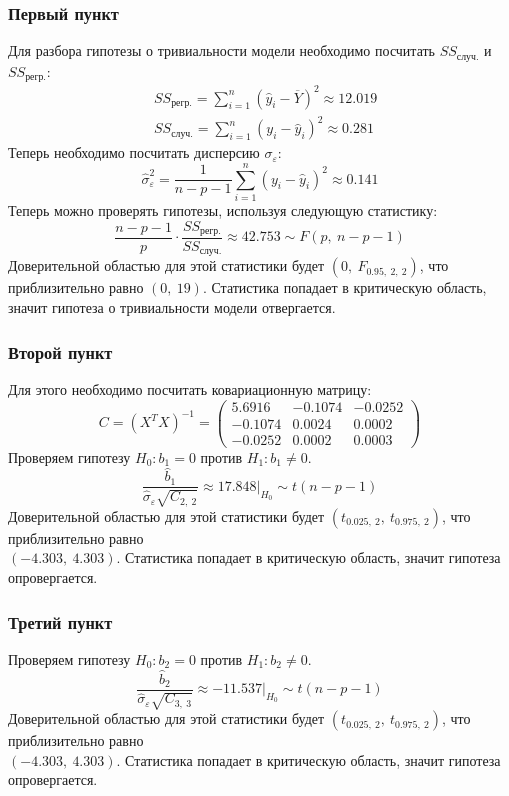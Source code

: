 \documentclass[12pt, a4paper]{article}
\begin{document}
\subsubsection*{Первый пункт}
Для разбора гипотезы о тривиальности модели необходимо посчитать $SS_{\text{случ.}}$ и $SS_{\text{регр.}}$:
\[
\begin{aligned}
    & SS_{\text{регр.}} = \sum_{i = 1}^{n} {\left( \hat y_i - \overline{Y} \right)}^2 \approx 12.019\\
    & SS_{\text{случ.}} = \sum_{i = 1}^{n} {\left( y_i - \hat y_i \right)}^2 \approx 0.281
\end{aligned}
\]
Теперь необходимо посчитать дисперсию $\sigma_{\varepsilon}$:
\[
\hat \sigma^2_{\varepsilon} = \frac{1}{n - p - 1} \sum_{i = 1}^{n} {\left( y_i - \hat y_i \right)}^2 \approx 0.141
\]
Теперь можно проверять гипотезы, используя следующую статистику:
\[
\frac{n - p - 1}{p} \cdot \frac{SS_{\text{регр.}}}{SS_{\text{случ.}}} \approx 42.753 \sim F(p,\ n - p - 1)
\]
Доверительной областью для этой статистики будет $(0,\ F_{0.95,\ 2,\ 2})$, что приблизительно равно $(0,\ 19)$. Статистика попадает в критическую область, значит гипотеза о тривиальности модели отвергается.
\subsubsection*{Второй пункт}
Для этого необходимо посчитать ковариационную матрицу:
\[
C = {\left( X^T X \right)}^{-1} = \begin{pmatrix}
    5.6916 & -0.1074 & -0.0252\\
    -0.1074 & 0.0024 & 0.0002\\
    -0.0252 & 0.0002 & 0.0003
\end{pmatrix}
\]
Проверяем гипотезу $H_0: b_1 = 0$ против $H_1: b_1 \neq 0$.
\[
\frac{\hat b_1}{\hat \sigma_{\varepsilon}\sqrt{C_{2,\ 2}}} \approx 17.848 \Big|_{H_0} \sim t(n - p - 1)
\]
Доверительной областью для этой статистики будет $(t_{0.025,\ 2},\ t_{0.975,\ 2})$, что приблизительно равно\\ $(-4.303,\ 4.303)$. Статистика попадает в критическую область, значит гипотеза опровергается.
\subsubsection*{Третий пункт}
Проверяем гипотезу $H_0: b_2 = 0$ против $H_1: b_2 \neq 0$.
\[
\frac{\hat b_2}{\hat \sigma_{\varepsilon}\sqrt{C_{3,\ 3}}} \approx -11.537 \Big|_{H_0} \sim t(n - p - 1)
\]
Доверительной областью для этой статистики будет $(t_{0.025,\ 2},\ t_{0.975,\ 2})$, что приблизительно равно\\ $(-4.303,\ 4.303)$. Статистика попадает в критическую область, значит гипотеза опровергается.
\end{document}
